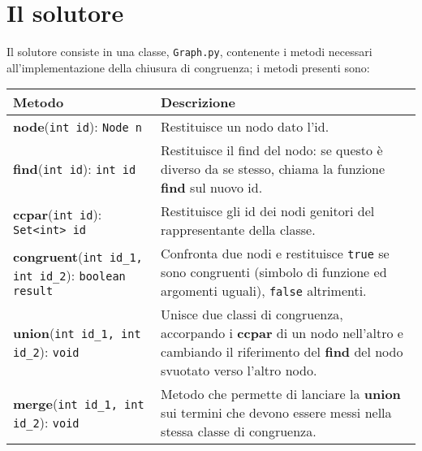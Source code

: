 \section{Il solutore}
Il solutore consiste in una classe, \texttt{Graph.py}, contenente i metodi necessari all'implementazione
della chiusura di congruenza; i metodi presenti sono:
\begin{center}
    \begin{tabular}{|m{6cm}|m{6cm}|}
        \hline
        \textbf{Metodo} & \textbf{Descrizione} \\ \hline
         \textbf{node}(\texttt{int id}): \texttt{Node n} & Restituisce un nodo dato l'id. \\ \hline
         \textbf{find}(\texttt{int id}): \texttt{int id} & Restituisce il find del nodo: se questo è diverso
                    da se stesso, chiama la funzione \textbf{find} sul nuovo id. \\ \hline
         \textbf{ccpar}(\texttt{int id}): \texttt{Set<int> id} & Restituisce gli id dei nodi genitori del rappresentante
                    della classe. \\ \hline
        \textbf{congruent}(\texttt{int id\_1, int id\_2}): \texttt{boolean result} & Confronta due nodi e restituisce
                    \texttt{true} se sono congruenti (simbolo di funzione ed argomenti uguali),
                    \texttt{false} altrimenti. \\ \hline
        \textbf{union}(\texttt{int id\_1, int id\_2}): \texttt{void} & Unisce due classi di congruenza,
                    accorpando i \textbf{ccpar} di un nodo nell'altro e cambiando il riferimento del \textbf{find} del
                    nodo svuotato verso l'altro nodo. \\ \hline
        \textbf{merge}(\texttt{int id\_1, int id\_2}): \texttt{void} & Metodo che permette di lanciare la \textbf{union}
                    sui termini che devono essere messi nella stessa classe di congruenza. \\ \hline
    \end{tabular}
\end{center}


